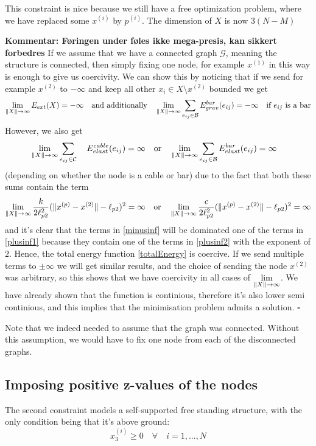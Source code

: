 This constraint is nice because we still have a free optimization problem, where we have replaced some $x^{(i)}$ by $p^{(i)}$. The dimension of $X$ is now $3(N-M)$

\textbf{Kommentar: Føringen under føles ikke mega-presis, kan sikkert forbedres}
If we assume that we have a connected graph $\mathcal{G}$, meaning the structure is connected, then simply fixing one node, for example $x^{(1)}$ in this way is enough to give us coercivity. We can show this by noticing that if we send for example $x^{(2)}$ to $-\infty$ and keep all other $x_i \in X \setminus x^{(2)}$ bounded we get
\begin{equation}
  \lim\limits_{\rVert X \lVert \to \infty} E_{ext}(X) = -\infty
\quad\text{and additionally}\quad
\lim\limits_{\rVert X \lVert \to \infty} \sum\limits_{e_{ij} \in \mathcal{B}} E^{bar}_{grav}(e_{ij}) = -\infty \quad \text{if $e_{ij}$ is a bar}
\label{minusinf}
\end{equation}
However, we also get
\begin{equation}
     \lim\limits_{\rVert X \lVert \to \infty} \sum\limits_{e_{ij} \in \mathcal{C}}\quad E^{cable}_{elast}(e_{ij}) = \infty \quad \text{or}\quad \lim\limits_{\rVert X \lVert \to \infty} \sum\limits_{e_{ij} \in \mathcal{B }}E^{bar}_{elast}(e_{ij}) = \infty \quad
     \label{plusinf1}
\end{equation} (depending on whether the node is a cable or bar)
due to the fact that both these sums contain the term \begin{equation}
 \lim\limits_{\rVert X \lVert \to \infty} \frac{k}{2 \ell_{p2}^2}(\lVert x^{(p)} - x^{(2)} \rVert-\ell_{p2})^2 = \infty \quad \text{or} \quad \lim\limits_{\rVert X \lVert \to \infty} \frac{c}{2 \ell_{p2}^2}(\lVert x^{(p)} - x^{(2)} \rVert-\ell_{p2})^2 = \infty
 \label{plusinf2}
\end{equation}
and it's clear that the terms in \eqref{minusinf} will be dominated one of the terms in \eqref{plusinf1} because they contain one of the terms in \eqref{plusinf2} with the exponent of $2$. Hence, the total energy function \eqref{totalEnergy} is coercive. If we send multiple terms to $\pm \infty$ we will get similar results, and the choice of sending the node $x^{(2)}$ was arbitrary, so this shows that we have coercivity in all cases of $\lim\limits_{\rVert X \lVert \to \infty}$. We have already shown that the function is continious, therefore it's also lower semi continious, and this implies that the minimisation problem admits a solution. $\square$

Note that we indeed needed to assume that the graph was connected. Without this assumption, we would have to fix one node from each of the disconnected graphs.

\subsection{Imposing positive z-values of the nodes}
The second constraint models a self-supported free standing structure, with the only condition being that it's above ground:
\begin{equation}
    x_3^{(i)} \geq 0 \quad \forall \quad i = 1,...,N
\end{equation}

